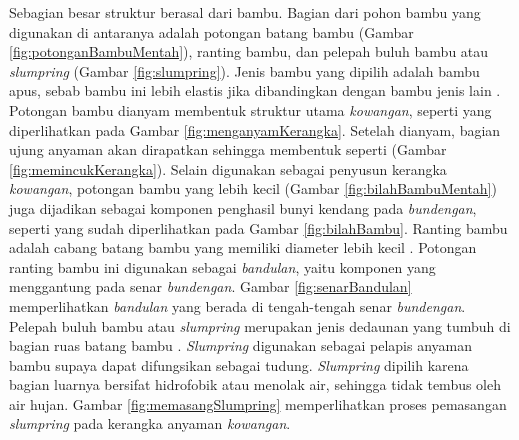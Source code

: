 Sebagian besar struktur \bundengan berasal dari bambu. Bagian dari pohon bambu yang digunakan di antaranya adalah potongan batang bambu (Gambar \ref{fig:potonganBambuMentah}), ranting bambu, dan pelepah buluh bambu atau \textit{slumpring} (Gambar \ref{fig:slumpring}). Jenis bambu yang dipilih adalah bambu apus, sebab bambu ini lebih elastis jika dibandingkan dengan bambu jenis lain \cite{skripsiSaid}. Potongan bambu dianyam membentuk struktur utama \textit{kowangan}, seperti yang diperlihatkan pada Gambar \ref{fig:menganyamKerangka}. Setelah dianyam, bagian ujung anyaman akan dirapatkan sehingga membentuk seperti \kowangan (Gambar \ref{fig:memincukKerangka}). Selain digunakan sebagai penyusun kerangka \textit{kowangan}, potongan bambu yang lebih kecil (Gambar \ref{fig:bilahBambuMentah}) juga dijadikan sebagai komponen penghasil bunyi kendang pada \textit{bundengan}, seperti yang sudah diperlihatkan pada Gambar \ref{fig:bilahBambu}. Ranting bambu adalah cabang batang bambu yang memiliki diameter lebih kecil \cite{skripsiSaid}. Potongan ranting bambu ini digunakan sebagai \textit{bandulan}, yaitu komponen yang menggantung pada senar \textit{bundengan}. Gambar \ref{fig:senarBandulan} memperlihatkan \textit{bandulan} yang berada di tengah-tengah senar \textit{bundengan}. Pelepah buluh bambu atau \textit{slumpring} merupakan jenis dedaunan yang tumbuh di bagian ruas batang bambu \cite{skripsiSaid}. \textit{Slumpring} digunakan sebagai pelapis anyaman bambu supaya dapat difungsikan sebagai tudung. \textit{Slumpring} dipilih karena bagian luarnya bersifat hidrofobik atau menolak air, sehingga tidak tembus oleh air hujan. Gambar \ref{fig:memasangSlumpring} memperlihatkan proses pemasangan \textit{slumpring} pada kerangka anyaman \textit{kowangan}. \par 
